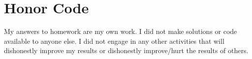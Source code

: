 \documentclass[a4paper,11pt]{article}
\begin{document}


\section*{Honor Code}


My answers to homework are my own work. I did not make solutions or code available to anyone else. I did not engage in any other activities that will dishonestly improve my results or dishonestly improve/hurt the results of others.
\end{document}
